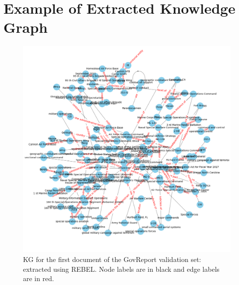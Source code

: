 \section{Example of Extracted Knowledge Graph}
\begin{figure}[hp]
    \centering
    \includegraphics[width=14cm]{images/KG.png}
    \caption{KG for the first document of the GovReport validation set:
    extracted using REBEL. Node labels are in black and edge labels are in red.}
    \label{fig-galaxy}
\end{figure}
